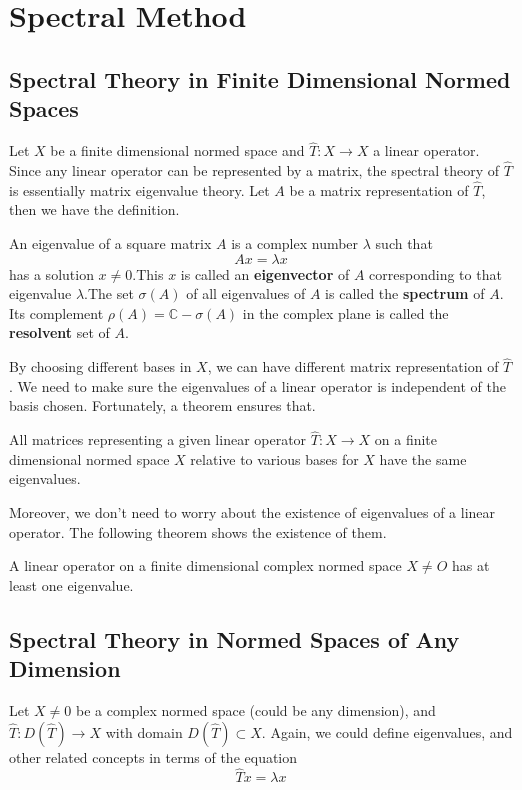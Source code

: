 \chapter{Spectral Method} \label{chap:spectral-method}
\section{Spectral Theory in Finite Dimensional Normed Spaces}
Let $X$ be a finite dimensional normed space and $\hat{T}: X \to X$ a linear operator. Since any linear operator can be represented by a matrix, the spectral theory of $\hat{T}$ is essentially matrix eigenvalue theory. \cite{kreyszig_introductory_1978} Let $A$ be a matrix representation of $\hat{T}$, then we have the definition.

\begin{definition}
	An eigenvalue of a square matrix $A$ is a complex number $\lambda$ such that
	\[ Ax = \lambda x \]
	has a solution $x\neq 0$.This $x$ is called an \textbf{eigenvector} of $A$ corresponding to that eigenvalue $\lambda$.The set $\sigma(A)$ of all eigenvalues of $A$ is called the \textbf{spectrum} of $A$. Its complement $\rho(A) = \mathbb{C}-\sigma(A)$ in the complex plane is called the \textbf{resolvent} set of $A$.
\end{definition}

By choosing different bases in $X$, we can have different matrix representation of $\hat{T}$. We need to make sure the eigenvalues of a linear operator is independent of the basis chosen. Fortunately, a theorem ensures that.

\begin{theorem}
	All matrices representing a given linear operator $\hat{T}: X \to X$ on a finite dimensional normed space $X$ relative to various bases for $X$ have the same eigenvalues.
\end{theorem}


Moreover, we don't need to worry about the existence of eigenvalues of a linear operator. The following theorem shows the existence of them.
\begin{theorem}
	A linear operator on a finite dimensional complex normed space $X\neq{O}$ has at least one eigenvalue.
\end{theorem}


\section{Spectral Theory in Normed Spaces of Any Dimension}
Let $X\neq {0}$ be a complex normed space (could be any dimension), and $\hat{T}: D(\hat{T}) \to X$ with domain $D(\hat{T}) \subset X$. Again, we could define eigenvalues, and other related concepts in terms of the equation
\[ \hat{T}x = \lambda x \]

